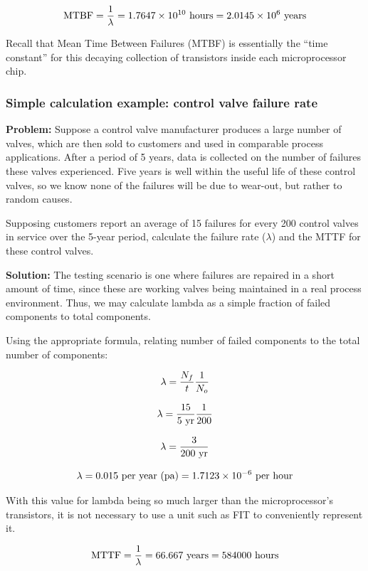$$\hbox{MTBF} = {1 \over \lambda} = 1.7647 \times 10^{10} \hbox{ hours} = 2.0145 \times 10^6 \hbox{ years}$$

Recall that Mean Time Between Failures (MTBF) is essentially the ``time constant'' for this decaying collection of transistors inside each microprocessor chip.





\filbreak
\subsubsection{Simple calculation example: control valve failure rate}

\noindent
\textbf{Problem:} Suppose a control valve manufacturer produces a large number of valves, which are then sold to customers and used in comparable process applications.  After a period of 5 years, data is collected on the number of failures these valves experienced.  Five years is well within the useful life of these control valves, so we know none of the failures will be due to wear-out, but rather to random causes.

Supposing customers report an average of 15 failures for every 200 control valves in service over the 5-year period, calculate the failure rate ($\lambda$) and the MTTF for these control valves.

\vskip 10pt

\noindent
\textbf{Solution:} The testing scenario is one where failures are repaired in a short amount of time, since these are working valves being maintained in a real process environment.  Thus, we may calculate lambda as a simple fraction of failed components to total components.

Using the appropriate formula, relating number of failed components to the total number of components:

$$\lambda = {{N_f \over t} {1 \over N_o}}$$

$$\lambda = {{15 \over 5 \hbox{ yr}} {1 \over 200}}$$

$$\lambda = {3 \over 200 \hbox{ yr}}$$

$$\lambda = 0.015 \hbox{ per year (pa)} = 1.7123 \times 10^{-6} \hbox{ per hour}$$

With this value for lambda being so much larger than the microprocessor's transistors, it is not necessary to use a unit such as FIT to conveniently represent it.

$$\hbox{MTTF} = {1 \over \lambda} = 66.667 \hbox{ years} = 584000 \hbox{ hours}$$

